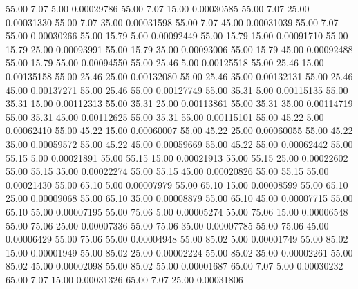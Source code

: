      55.00      7.07      5.00     0.00029786
     55.00      7.07     15.00     0.00030585
     55.00      7.07     25.00     0.00031330
     55.00      7.07     35.00     0.00031598
     55.00      7.07     45.00     0.00031039
     55.00      7.07     55.00     0.00030266
     55.00     15.79      5.00     0.00092449
     55.00     15.79     15.00     0.00091710
     55.00     15.79     25.00     0.00093991
     55.00     15.79     35.00     0.00093006
     55.00     15.79     45.00     0.00092488
     55.00     15.79     55.00     0.00094550
     55.00     25.46      5.00     0.00125518
     55.00     25.46     15.00     0.00135158
     55.00     25.46     25.00     0.00132080
     55.00     25.46     35.00     0.00132131
     55.00     25.46     45.00     0.00137271
     55.00     25.46     55.00     0.00127749
     55.00     35.31      5.00     0.00115135
     55.00     35.31     15.00     0.00112313
     55.00     35.31     25.00     0.00113861
     55.00     35.31     35.00     0.00114719
     55.00     35.31     45.00     0.00112625
     55.00     35.31     55.00     0.00115101
     55.00     45.22      5.00     0.00062410
     55.00     45.22     15.00     0.00060007
     55.00     45.22     25.00     0.00060055
     55.00     45.22     35.00     0.00059572
     55.00     45.22     45.00     0.00059669
     55.00     45.22     55.00     0.00062442
     55.00     55.15      5.00     0.00021891
     55.00     55.15     15.00     0.00021913
     55.00     55.15     25.00     0.00022602
     55.00     55.15     35.00     0.00022274
     55.00     55.15     45.00     0.00020826
     55.00     55.15     55.00     0.00021430
     55.00     65.10      5.00     0.00007979
     55.00     65.10     15.00     0.00008599
     55.00     65.10     25.00     0.00009068
     55.00     65.10     35.00     0.00008879
     55.00     65.10     45.00     0.00007715
     55.00     65.10     55.00     0.00007195
     55.00     75.06      5.00     0.00005274
     55.00     75.06     15.00     0.00006548
     55.00     75.06     25.00     0.00007336
     55.00     75.06     35.00     0.00007785
     55.00     75.06     45.00     0.00006429
     55.00     75.06     55.00     0.00004948
     55.00     85.02      5.00     0.00001749
     55.00     85.02     15.00     0.00001949
     55.00     85.02     25.00     0.00002224
     55.00     85.02     35.00     0.00002261
     55.00     85.02     45.00     0.00002098
     55.00     85.02     55.00     0.00001687
     65.00      7.07      5.00     0.00030232
     65.00      7.07     15.00     0.00031326
     65.00      7.07     25.00     0.00031806
